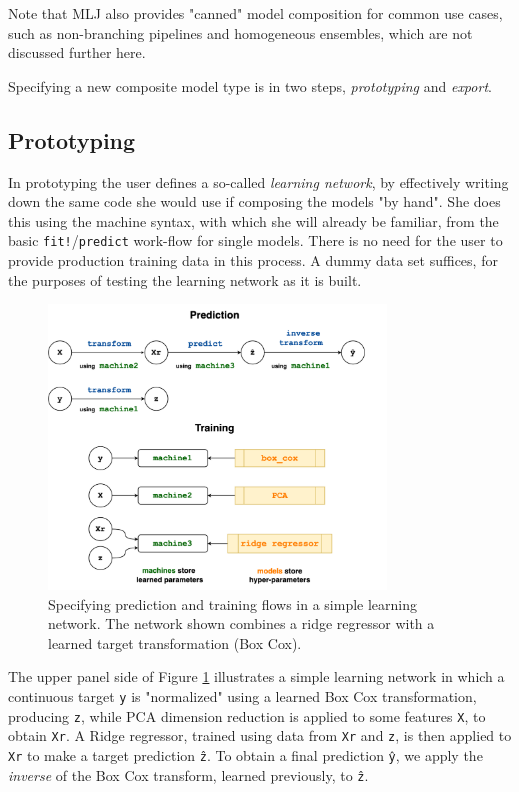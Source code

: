 \documentclass{article}
\begin{document}
Note that MLJ also provides "canned" model composition for common use cases, such as non-branching pipelines and homogeneous ensembles, which are not discussed further here.

Specifying a new composite model type is in two steps, \textit{prototyping} and \textit{export}.

\subsection{Prototyping}

In prototyping the user defines a so-called \textit{learning network}, by effectively writing down the same code she would use if composing the models "by hand". She does this using the machine syntax, with which she will already be familiar, from the basic \texttt{fit!}/\texttt{predict} work-flow for single models. There is no need for the user to provide production training data in this process. A dummy data set suffices, for the purposes of testing the learning network as it is built.

\begin{figure}
  \centering
  \includegraphics[width=0.8\textwidth]{target_transformerVERTICAL}
  \caption{Specifying prediction and training flows in a simple learning network. The network shown combines a ridge regressor with a learned target transformation (Box Cox).}
  \label{fig:fig2}
\end{figure}

The upper panel side of Figure \ref{fig:fig2} illustrates a simple learning network in which a continuous target \texttt{y} is "normalized" using a learned Box Cox transformation, producing \texttt{z}, while PCA dimension reduction is applied to some features \texttt{X}, to obtain \texttt{Xr}. A Ridge regressor, trained using data from \texttt{Xr} and \texttt{z}, is then applied to \texttt{Xr} to make a target prediction \texttt{\^{z}}. To obtain a final prediction \texttt{\^{y}}, we apply the \textit{inverse} of the Box Cox transform, learned previously, to \texttt{\^{z}}. 
\end{document}
